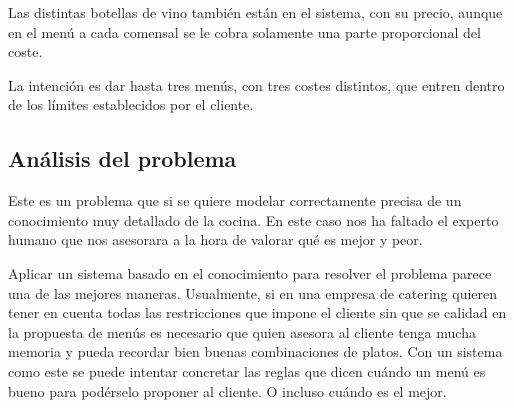Las distintas botellas de vino también están en el sistema, con su precio,
aunque en el menú a cada comensal se le cobra solamente una parte proporcional
del coste.

La intención es dar hasta tres menús, con tres costes distintos, que entren
dentro de los límites establecidos por el cliente.

\subsection{Análisis del problema}
Este es un problema que si se quiere modelar correctamente precisa de un
conocimiento muy detallado de la cocina. En este caso nos ha faltado el experto
humano que nos asesorara a la hora de valorar qué es mejor y peor.

Aplicar un sistema basado en el conocimiento para resolver el problema parece
una de las mejores maneras. Usualmente, si en una empresa de catering quieren
tener en cuenta todas las restricciones que impone el cliente sin que se
calidad en la propuesta de menús es necesario que quien asesora al cliente
tenga mucha memoria y pueda recordar bien buenas combinaciones de platos. Con
un sistema como este se puede intentar concretar las reglas que dicen cuándo un
menú es bueno para podérselo proponer al cliente. O incluso cuándo es el mejor.
